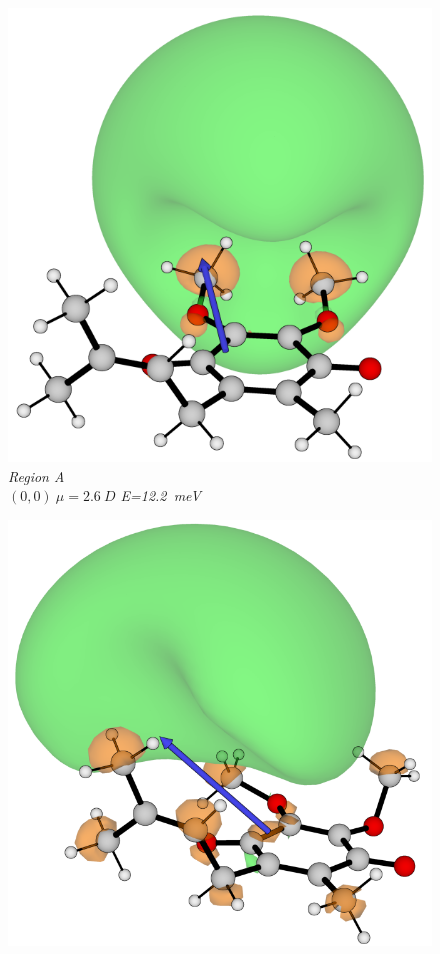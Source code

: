 \begin{figure}[h]
  \centering
    \begin{minipage}[b]{0.30\textwidth}
    \centering
      \includegraphics[width=1\textwidth]{chapters/results/image/Q1_199.png}
      \small\emph{Region A \\$(0,0)~\mu=2.6~D$ E=12.2~meV}
  \end{minipage}
  \hfill
  \begin{minipage}[b]{0.30\textwidth}
    \centering
      \includegraphics[width=\textwidth]{chapters/results/image/Q1_249.png}

\end{minipage}
\end{figure}
